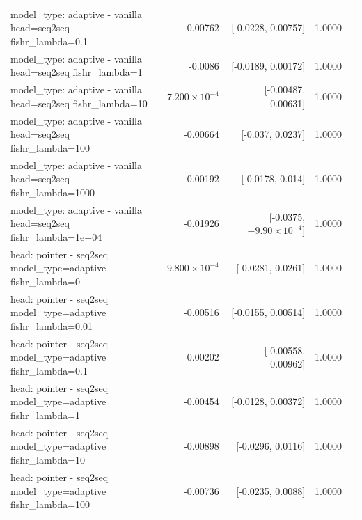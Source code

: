 \documentclass[10pt]{article}
\makeatletter
\newcommand{\stackcell}[1]{\begin{tabular}[t]{@{}l@{}}#1\end{tabular}}
\makeatother
\begin{document}
{\begin{longtable}{lrrrl}
\stackcell{model\_type: adaptive - vanilla\\\footnotesize head=seq2seq fishr\_lambda=0.1 } & -0.00762 & [-0.0228, 0.00757] & 1.0000 & \\
\stackcell{model\_type: adaptive - vanilla\\\footnotesize head=seq2seq fishr\_lambda=1 } & -0.0086 & [-0.0189, 0.00172] & 1.0000 & \\
\stackcell{model\_type: adaptive - vanilla\\\footnotesize head=seq2seq fishr\_lambda=10 } & $7.200\times10^{-4}$ & [-0.00487, 0.00631] & 1.0000 & \\
\stackcell{model\_type: adaptive - vanilla\\\footnotesize head=seq2seq fishr\_lambda=100 } & -0.00664 & [-0.037, 0.0237] & 1.0000 & \\
\stackcell{model\_type: adaptive - vanilla\\\footnotesize head=seq2seq fishr\_lambda=1000 } & -0.00192 & [-0.0178, 0.014] & 1.0000 & \\
\stackcell{model\_type: adaptive - vanilla\\\footnotesize head=seq2seq fishr\_lambda=1e+04 } & -0.01926 & [-0.0375, $-9.90\times10^{-4}$] & 1.0000 & \\
\stackcell{head: pointer - seq2seq\\\footnotesize model\_type=adaptive fishr\_lambda=0 } & $-9.800\times10^{-4}$ & [-0.0281, 0.0261] & 1.0000 & \\
\stackcell{head: pointer - seq2seq\\\footnotesize model\_type=adaptive fishr\_lambda=0.01 } & -0.00516 & [-0.0155, 0.00514] & 1.0000 & \\
\stackcell{head: pointer - seq2seq\\\footnotesize model\_type=adaptive fishr\_lambda=0.1 } & 0.00202 & [-0.00558, 0.00962] & 1.0000 & \\
\stackcell{head: pointer - seq2seq\\\footnotesize model\_type=adaptive fishr\_lambda=1 } & -0.00454 & [-0.0128, 0.00372] & 1.0000 & \\
\stackcell{head: pointer - seq2seq\\\footnotesize model\_type=adaptive fishr\_lambda=10 } & -0.00898 & [-0.0296, 0.0116] & 1.0000 & \\
\stackcell{head: pointer - seq2seq\\\footnotesize model\_type=adaptive fishr\_lambda=100 } & -0.00736 & [-0.0235, 0.0088] & 1.0000 & \\

\end{longtable}}
\end{document}
